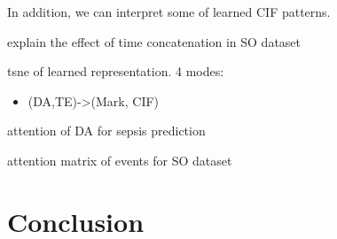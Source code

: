\documentclass[journal,twoside,web]{ieeecolor}
\begin{document}
In addition, we can interpret some of learned CIF patterns.

explain the effect of time concatenation in SO dataset



tsne of learned representation. 4 modes:


\begin{itemize}
    \item (DA,TE)->(Mark, CIF)
\end{itemize}

attention of DA for sepsis prediction

attention matrix of events for SO dataset

\section{Conclusion}
\label{sec:Conclusion}















\end{document}
